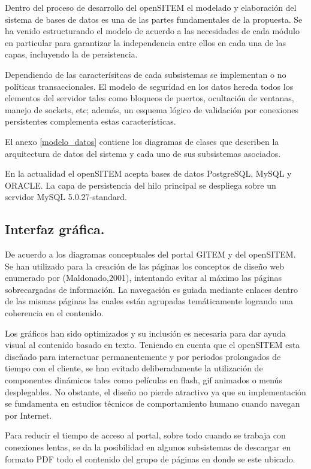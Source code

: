 Dentro del proceso de desarrollo del openSITEM el modelado y elaboración del sistema de bases de datos es una de las partes fundamentales de la propuesta. Se ha venido estructurando el modelo de acuerdo a las necesidades de cada módulo en particular para garantizar la independencia entre ellos en cada una de las capas, incluyendo la de persistencia.

Dependiendo de las caracterísitcas de cada subsistemas se implementan o no políticas transaccionales. El modelo de seguridad en los datos hereda todos los elementos del servidor tales como bloqueos de puertos, ocultación de ventanas, manejo de sockets, etc; además, un esquema lógico de validación por conexiones persistentes complementa estas características.

El anexo \ref{modelo_datos} contiene los diagramas de clases que describen la arquitectura de datos del sistema y cada uno de sus subsistemas asociados. 

En la actualidad el openSITEM acepta bases de datos PostgreSQL, MySQL y ORACLE. La capa de persistencia del hilo principal se despliega sobre un servidor MySQL 5.0.27-standard.


\subsection{Interfaz gráfica.}

De acuerdo a los diagramas conceptuales del portal GITEM y del openSITEM. Se han utilizado para la creación de las páginas los conceptos de diseño web enumerado por (Maldonado,2001), intentando evitar al máximo las páginas sobrecargadas de información. La navegación es guiada mediante enlaces dentro de las mismas páginas las cuales están agrupadas temáticamente logrando una coherencia en el contenido. 

Los gráficos han sido optimizados y su inclusión es necesaria para dar ayuda visual al contenido basado en texto. Teniendo en cuenta que el openSITEM esta diseñado para interactuar permanentemente y por periodos prolongados de tiempo con el cliente, se han evitado deliberadamente la utilización  de componentes dinámicos tales como películas en flash, gif animados o menús desplegables. No obstante, el diseño no pierde atractivo ya que su implementación se fundamenta en estudios técnicos de comportamiento humano cuando navegan por Internet.

Para reducir el tiempo de acceso al portal, sobre todo cuando se trabaja con conexiones lentas, se da la posibilidad en algunos subsistemas de descargar en formato PDF todo el contenido del grupo de páginas en donde se este ubicado.

